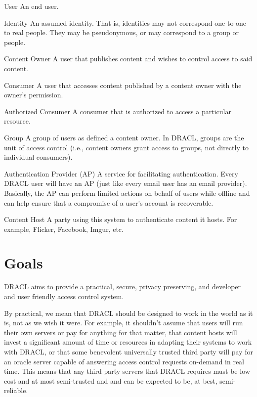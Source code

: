 \documentclass[pdftex,12pt,a4papaer]{report}
\begin{document}
\begin{compactdesc}
    \item[User] An end user.
    \item[Identity] An assumed identity. That is, identities may not correspond
      one-to-one to real people. They may be pseudonymous, or may correspond to
      a group or people.
    \item[Content Owner] A user that publishes content and wishes to control
      access to said content.
    \item[Consumer] A user that accesses content published by a content owner
      with the owner's permission.
    \item[Authorized Consumer] A consumer that is authorized to access a
      particular resource.
    \item[Group] A group of users as defined a content owner. In DRACL, groups
      are the unit of access control (i.e., content owners grant access to
      groups, not directly to individual consumers).
    \item[Authentication Provider] (AP) A service for facilitating
      authentication. Every DRACL user will have an AP (just like every email
      user has an email provider). Basically, the AP can perform limited
      actions on behalf of users while offline and can help ensure that a
      compromise of a user's account is recoverable.
    \item[Content Host] A party using this system to authenticate content it
      hosts. For example, Flicker, Facebook, Imgur, etc.
\end{compactdesc}

\section{Goals}

DRACL aims to provide a practical, secure, privacy preserving, and developer and user
friendly access control system.

By practical, we mean that DRACL should be designed to work in the world as it
is, not as we wish it were. For example, it shouldn't assume that users will run
their own servers or pay for anything for that matter, that content hosts will
invest a significant amount of time or resources in adapting their systems to
work with DRACL, or that some benevolent universally trusted third party will
pay for an oracle server capable of answering access control requests on-demand
in real time. This means that any third party servers that DRACL requires must
be low cost and at most semi-trusted and and can be expected to be, at best,
semi-reliable.
\end{document}
